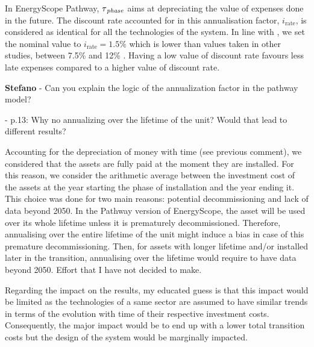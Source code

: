 \documentclass[12pt,a4paper]{article}
\begin{document}
\begin{mdframed}[style=manuscript] %
In EnergyScope Pathway, $\tau\textsubscript{\emph{phase}}$ aims at depreciating the value of expenses done in the future. The discount rate accounted for in this annualisation factor, $i_{\text{rate}}$, is considered as identical for all the technologies of the system. In line with \citet{limpens2021generating}, we set the nominal value to $i_{\text{rate}}=1.5\%$ which is lower than values taken in other studies, between 7.5\% and 12\% \cite{meinke2017energy,simoes2013jrc,EuropeanCommission2016}. Having a low value of discount rate favours less late expenses compared to a higher value of discount rate.
\end{mdframed}

\begin{mdframed}[style=comment] %
{\color{orange} \textbf{Stefano}} - Can you explain the logic of the annualization factor in the pathway model?

 - p.13: Why no annualizing over the lifetime of the unit? Would that lead to different results? 
\end{mdframed}

\noindent Accounting for the depreciation of money with time (see previous comment), we considered that the assets are fully paid at the moment they are installed. For this reason, we consider the arithmetic average between the investment cost of the assets at the year starting the phase of installation and the year ending it. This choice was done for two main reasons: potential decommissioning and lack of data beyond 2050. In the Pathway version of EnergyScope, the asset will be used over its whole lifetime unless it is prematurely decommissioned. Therefore, annualising over the entire lifetime of the unit might induce a bias in case of this premature decommissioning. Then, for assets with longer lifetime and/or installed later in the transition, annualising over the lifetime would require to have data beyond 2050. Effort that I have not decided to make.

Regarding the impact on the results, my educated guess is that this impact would be limited as the technologies of a same sector are assumed to have similar trends in terms of the evolution with time of their respective investment costs. Consequently, the major impact would be to end up with a lower total transition costs but the design of the system would be marginally impacted.
\end{document}
